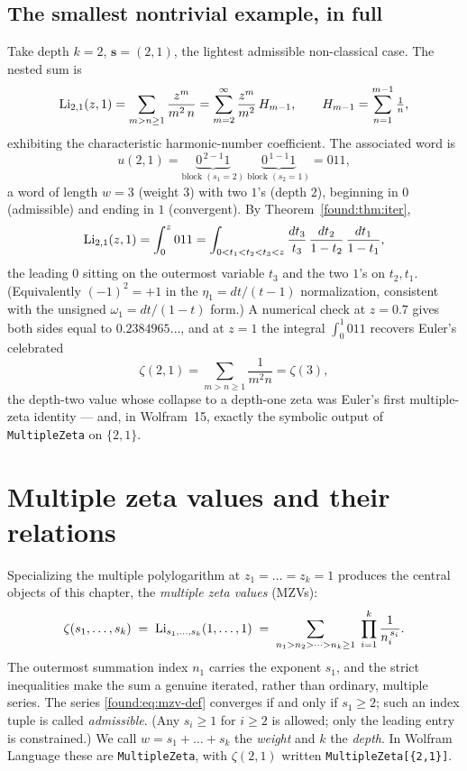 \subsection{The smallest nontrivial example, in full}

Take depth $k=2$, $\mathbf s=(2,1)$, the lightest admissible non-classical case. The nested sum is
\[
  \operatorname{Li}_{2,1}(z,1)=\sum_{m>n\ge1}\frac{z^m}{m^2\,n}
  =\sum_{m=2}^{\infty}\frac{z^m}{m^2}\,H_{m-1},\qquad H_{m-1}=\sum_{n=1}^{m-1}\tfrac1n,
\]
exhibiting the characteristic harmonic-number coefficient. The associated word is
\[
  u(2,1)=\underbrace{0^{\,2-1}1}_{\text{block }(s_1=2)}\ \underbrace{0^{\,1-1}1}_{\text{block }(s_2=1)}=011,
\]
a word of length $w=3$ (weight $3$) with two $1$'s (depth $2$), beginning in $0$ (admissible) and ending in $1$ (convergent). By Theorem~\ref{found:thm:iter},
\[
  \operatorname{Li}_{2,1}(z,1)=\int_0^z 011
  =\int_{0<t_1<t_2<t_3<z}\frac{dt_3}{t_3}\,\frac{dt_2}{1-t_2}\,\frac{dt_1}{1-t_1},
\]
the leading $0$ sitting on the outermost variable $t_3$ and the two $1$'s on $t_2,t_1$. (Equivalently $(-1)^2=+1$ in the $\eta_1=dt/(t-1)$ normalization, consistent with the unsigned $\omega_1=dt/(1-t)$ form.) A numerical check at $z=0.7$ gives both sides equal to $0.2384965\ldots$, and at $z=1$ the integral $\int_0^1 011$ recovers Euler's celebrated
\[
  \zeta(2,1)=\sum_{m>n\ge1}\frac{1}{m^2 n}=\zeta(3),
\]
the depth-two value whose collapse to a depth-one zeta was Euler's first multiple-zeta identity --- and, in Wolfram~15, exactly the symbolic output of \texttt{MultipleZeta} on $\{2,1\}$.


\section{Multiple zeta values and their relations}

Specializing the multiple polylogarithm at $z_1=\dots=z_k=1$ produces the central objects of this chapter, the \emph{multiple zeta values} (MZVs):
\begin{equation}
  \zeta(s_1,\dots,s_k) \;=\; \operatorname{Li}_{s_1,\dots,s_k}(1,\dots,1)
  \;=\; \sum_{n_1>n_2>\dots>n_k\ge1}\;\prod_{i=1}^{k}\frac{1}{n_i^{\,s_i}}.
  \label{found:eq:mzv-def}
\end{equation}
The outermost summation index $n_1$ carries the exponent $s_1$, and the strict inequalities make the sum a genuine iterated, rather than ordinary, multiple series. The series \eqref{found:eq:mzv-def} converges if and only if $s_1\ge2$; such an index tuple is called \emph{admissible}. (Any $s_i\ge1$ for $i\ge2$ is allowed; only the leading entry is constrained.) We call $w=s_1+\dots+s_k$ the \emph{weight} and $k$ the \emph{depth}. In Wolfram Language these are \texttt{MultipleZeta}, with $\zeta(2,1)$ written \texttt{MultipleZeta[\{2,1\}]}.

